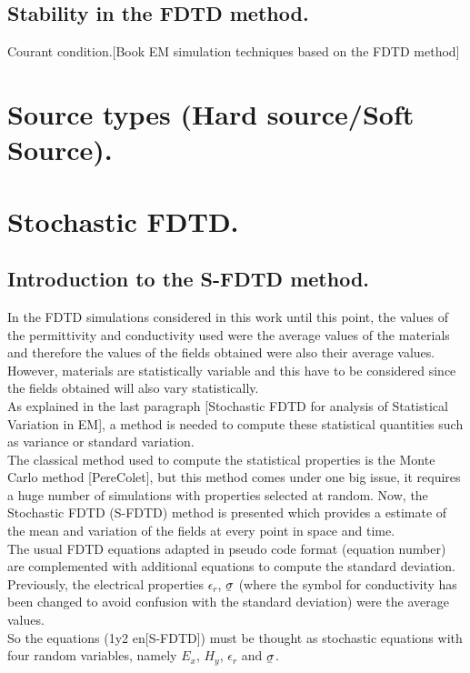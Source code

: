 \documentclass[12pt, oneside]{book}
\newcommand{\ubar}[1]{\underaccent{\bar}{#1}}
\begin{document}
\section{Stability in the FDTD method.}
Courant condition.[Book EM simulation techniques based on the FDTD method]


\chapter{Source types (Hard source/Soft Source).}


\chapter{Stochastic FDTD.}
\section{Introduction to the S-FDTD method.}
In the FDTD simulations considered in this work until this point, the values of the permittivity and conductivity used were the average values of the materials and therefore the values of the fields obtained were also their average values. However, materials are statistically variable and this have to be considered since the fields obtained will also vary statistically. \\
As explained in the last paragraph [Stochastic FDTD for analysis of Statistical Variation in EM], a method is needed to compute these statistical quantities such as variance or standard variation. \\
The classical method used to compute the statistical properties is the Monte Carlo method [PereColet], but this method comes under one big issue, it requires a huge number of simulations with properties selected at random.
Now, the Stochastic FDTD (S-FDTD) method is presented which provides a estimate of the mean and variation of the fields at every point in space and time. \\
The usual FDTD equations adapted in pseudo code format (equation number) are complemented with additional equations to compute the standard deviation. Previously, the electrical properties $\epsilon_r$, $\ubar{\sigma}$ (where the symbol for conductivity has been changed to avoid confusion with the standard deviation) were the average values. \\
So the equations (1y2 en[S-FDTD]) must be thought as stochastic equations with four random variables, namely $E_x$, $H_y$, $\epsilon_r$ and $\ubar{\sigma}$.
\end{document}
